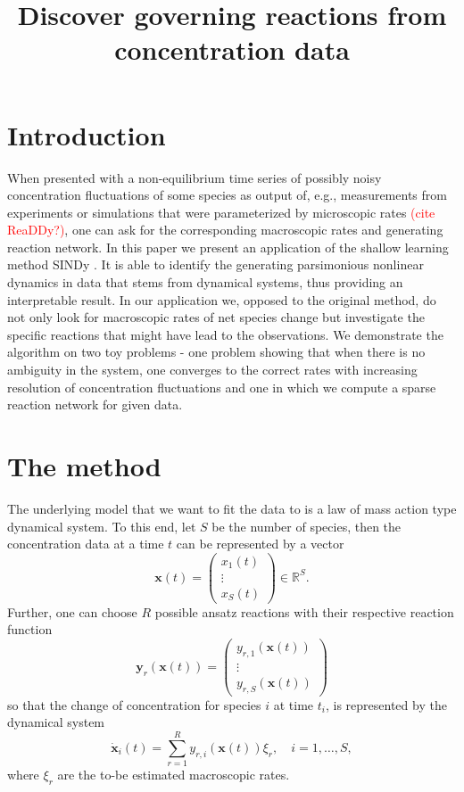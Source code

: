 \documentclass[oneside, abstracton, titlepage]{scrartcl}
\begin{document}
	\title{Discover governing reactions from concentration data}
	\maketitle
	
	\section{Introduction}
	When presented with a non-equilibrium time series of possibly noisy concentration fluctuations of some species as output of, e.g., measurements from experiments or simulations that were parameterized by microscopic rates \textcolor{red}{(cite ReaDDy?)}, one can ask for the corresponding macroscopic rates and generating reaction network. 
	In this paper we present an application of the shallow learning method SINDy \cite{Brunton2015}. It is able to identify the generating parsimonious nonlinear dynamics in data that stems from dynamical systems, thus providing an interpretable result.
	In our application we, opposed to the original method, do not only look for macroscopic rates of net species change but investigate the specific reactions that might have lead to the observations.
	We demonstrate the algorithm on two toy problems - one problem showing that when there is no ambiguity in the system, one converges to the correct rates with increasing resolution of concentration fluctuations and one in which we compute a sparse reaction network for given data.
	
	\section{The method}
	The underlying model that we want to fit the data to is a law of mass action type dynamical system. To this end, let $S$ be the number of species, then the concentration data at a time $t$ can be represented by a vector
	\[
	\mathbf{x}(t)=\begin{pmatrix}
	x_1(t)\\ \vdots \\ x_S(t)
	\end{pmatrix}\in \mathbb{R}^S.
	\]
	Further, one can choose $R$ possible ansatz reactions with their respective reaction function
	\[
	\textbf{y}_r(\textbf{x}(t))=\begin{pmatrix}
	y_{r,1}(\textbf{x}(t)) \\ \vdots \\ y_{r,S}(\textbf{x}(t))
	\end{pmatrix}
	\]
	so that the change of concentration for species $i$ at time $t_i$, is represented by the dynamical system
	\[
	\dot{\textbf{x}}_i(t) = \sum_{r=1}^{R}y_{r,i}(\textbf{x}(t))\xi_r,\quad i=1,\ldots, S,
	\]
	where $\xi_r$ are the to-be estimated macroscopic rates.
	
\end{document}
